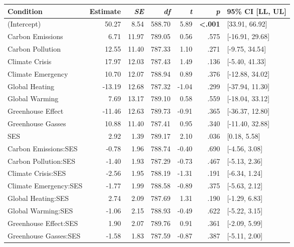 \begin{table}[ht]
\centering
\begin{tabular}{lrrrrrl}
  \hline
Condition & Estimate & \textit{SE} & \textit{df} & \textit{t} & \textit{p} & 95\% CI [LL, UL] \\ 
  \hline
(Intercept) & 50.27 & 8.54 & 588.70 & 5.89 & \textbf{\textless  .001} & [33.91, 66.92] \\ 
  Carbon Emissions & 6.71 & 11.97 & 789.05 & 0.56 & .575 & [-16.91, 29.68] \\ 
  Carbon Pollution & 12.55 & 11.40 & 787.33 & 1.10 & .271 & [-9.75, 34.54] \\ 
  Climate Crisis & 17.97 & 12.03 & 787.43 & 1.49 & .136 & [-5.40, 41.33] \\ 
  Climate Emergency & 10.70 & 12.07 & 788.94 & 0.89 & .376 & [-12.88, 34.02] \\ 
  Global Heating & -13.19 & 12.68 & 787.32 & -1.04 & .299 & [-37.94, 11.30] \\ 
  Global Warming & 7.69 & 13.17 & 789.10 & 0.58 & .559 & [-18.04, 33.12] \\ 
  Greenhouse Effect & -11.46 & 12.63 & 789.73 & -0.91 & .365 & [-36.37, 12.80] \\ 
  Greenhouse Gasses & 10.88 & 11.40 & 787.41 & 0.95 & .340 & [-11.40, 32.88] \\ 
  SES & 2.92 & 1.39 & 789.17 & 2.10 & .036 & [0.18, 5.58] \\ 
  Carbon Emissions:SES & -0.78 & 1.96 & 788.74 & -0.40 & .690 & [-4.56, 3.08] \\ 
  Carbon Pollution:SES & -1.40 & 1.93 & 787.29 & -0.73 & .467 & [-5.13, 2.36] \\ 
  Climate Crisis:SES & -2.56 & 1.95 & 788.19 & -1.31 & .191 & [-6.34, 1.24] \\ 
  Climate Emergency:SES & -1.77 & 1.99 & 788.58 & -0.89 & .375 & [-5.63, 2.12] \\ 
  Global Heating:SES & 2.74 & 2.09 & 787.69 & 1.31 & .190 & [-1.29, 6.83] \\ 
  Global Warming:SES & -1.06 & 2.15 & 788.93 & -0.49 & .622 & [-5.22, 3.15] \\ 
  Greenhouse Effect:SES & 1.90 & 2.07 & 789.76 & 0.91 & .361 & [-2.09, 5.99] \\ 
  Greenhouse Gasses:SES & -1.58 & 1.83 & 787.59 & -0.87 & .387 & [-5.11, 2.00] \\ 
   \hline
\end{tabular}
\end{table}

